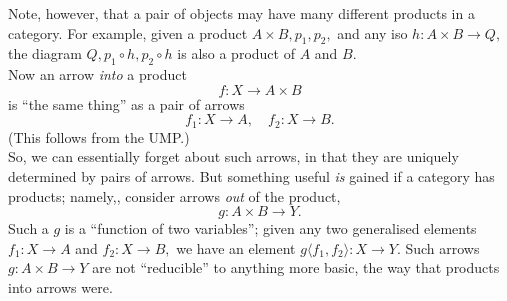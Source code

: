 \documentclass[11pt,leqno,landscape,semhelv]{seminar}
\numberwithin{equation}{section}
\theoremstyle{definition}
\numberwithin{thm}{section}
\numberwithin{equation}{section}
\begin{document}
Note, however, that a pair of objects may have many different products in a category. For example, given a product $A \times B, p_1, p_2,$ and any iso $h:A\times B \to Q,$ the diagram $Q, p_1\circ h, p_2\circ h$ is also a product of $A$ and $B.$\\
Now an arrow \emph{into} a product
\begin{equation*} 
	f : X \to A \times B
\end{equation*}
is ``the same thing'' as a pair of arrows
\begin{equation*} 
	f_1:X\to A, \quad f_2: X\to B.
\end{equation*}
(This follows from the UMP.)\\
So, we can essentially forget about such arrows, in that they are uniquely determined by pairs of arrows. But something useful \emph{is} gained if a category has products; namely,, consider arrows \emph{out} of the product,
\begin{equation*} 
	g:A\times B \to Y.
\end{equation*}
Such a $g$ is a ``function of two variables''; given any two generalised elements $f_1:X\to A$ and $f_2:X\to B,$ we have an element $g\langle f_1, f_2\rangle:X \to Y.$ Such arrows $g:A \times B \to Y$ are not ``reducible'' to anything more basic, the way that products into arrows were.
%
%
\end{document}
